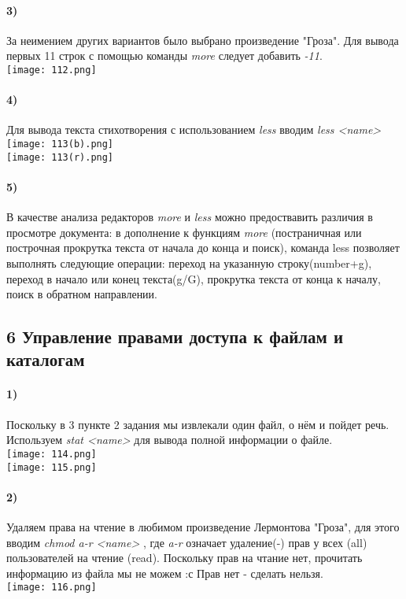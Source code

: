 		\paragraph{3)}
		За неимением других вариантов было выбрано произведение "Гроза". Для вывода 	первых 11 строк с помощью команды \textit{more} следует добавить \textit{-11}.
	\\
	\texttt{[image: 112.png]}
	\\
		\paragraph{4)}
		Для вывода текста стихотворения с использованием \textit{less} вводим 			\textit{less <name>}\\
	\texttt{[image: 113(b).png]}
	\\
	\texttt{[image: 113(r).png]}
	\\
		\paragraph{5)}
		В качестве анализа редакторов \textit{more} и \textit{less} можно 				предоствавить различия в просмотре документа: в дополнение к функциям 				\textit{more}  (постраничная или построчная прокрутка текста от начала до конца 	и поиск), команда less позволяет выполнять следующие операции: переход на 			указанную строку(number+g), переход в начало или  конец текста(g/G), прокрутка 		текста от конца к началу, поиск в обратном направлении.\\
		
	\subsection*{6 Управление правами доступа к файлам и каталогам}
	
		\paragraph{1)}
		Поскольку в 3 пункте 2 задания мы извлекали один файл, о нём и пойдет речь. 	Используем \textit{stat <name>} для вывода полной информации о файле.\\
	\texttt{[image: 114.png]}
	\\
	\texttt{[image: 115.png]}
	\\
		\paragraph{2)}
		Удаляем права на чтение в любимом произведение Лермонтова "Гроза", для 			этого вводим \textit{chmod a-r <name> }, где \textit{a-r} означает удаление(-) 		прав у всех (all)  пользователей на чтение (read). Поскольку прав на чтание 		нет, прочитать информацию из файла мы не можем :с
	Прав нет - сделать нельзя.\\
	\texttt{[image: 116.png]}
	\\
